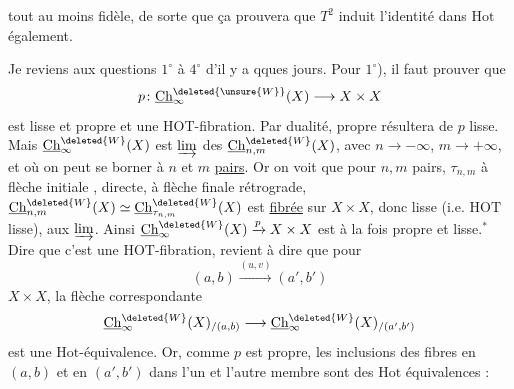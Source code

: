 tout au moins fidèle, de sorte que ça prouvera
que $T^2$ induit l'identité dans $\mathrm{Hot}$ également.

Je reviens aux questions $1^\circ$ à $4^\circ$ d'il y a qques
jours. Pour $1^\circ$), il faut prouver que
\[
p\colon\underline{\mathrm{Ch}}^{\deleted{\unsure{W}}}_{\infty}(X)\longrightarrow X\times X
\]
est lisse et propre et une $\mathrm{HOT}$-fibration. Par
dualité,  propre résultera de $p$ lisse. Mais
$\underline{\mathrm{Ch}}^{\deleted{W}}_{\infty}(X)$ est $\varinjlim$ des $\underline{\mathrm{Ch}}^{\deleted{W}}_{n,m}(X)$, avec $n\longrightarrow-\infty$, $m\longrightarrow+\infty$,
et où on peut se borner à $n$ et $m$ \uline{pairs}. Or
on voit que pour $n,m$ pairs,  $\tau_{n,m}$ à flèche
initiale , directe, à flèche finale rétrograde,
$\underline{\mathrm{Ch}}_{n,m}^{\deleted{W}}(X)\simeq\underline{\mathrm{Ch}}_{\tau_{n,m}}^{\deleted{W}}(X)$ est \uline{fibrée} sur $X\times X$,
donc  lisse (i.e. $\mathrm{HOT}$ lisse),
  aux $\varinjlim$.
Ainsi $\underline{\mathrm{Ch}}^{\deleted{W}}_{\infty}(X)\xrightarrow{p}X\times X$ est à la fois propre et
lisse.$^{*}$
Dire que c'est une $\mathrm{HOT}$-fibration, revient
à dire que pour
\[
(a,b)\xrightarrow{(u,v)}(a',b')
\]
 $X\times X$, la flèche correspondante
\[
\underline{\mathrm{Ch}}^{\deleted{W}}_{\infty}(X)_{/(a,b)}\longrightarrow
\underline{\mathrm{Ch}}^{\deleted{W}}_{\infty}(X)_{/(a',b')}
\]
est une $\mathrm{Hot}$-équivalence. Or, comme $p$ est
propre, les inclusions des fibres en $(a,b)$ et en
$(a',b')$ dans l'un et l'autre membre sont des
$\mathrm{Hot}$ équivalences :
